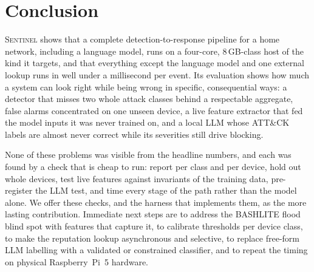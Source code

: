 \section{Conclusion}
\label{sec:conclusion}

\textsc{Sentinel} shows that a complete detection-to-response pipeline for a
home network, including a language model, runs on a four-core, 8\,GB-class host of the kind it targets,
and that everything except the language model and one external lookup runs in
well under a millisecond per event. Its evaluation shows how much a system can
look right while being wrong in specific, consequential ways: a detector that
misses two whole attack classes behind a respectable aggregate, false alarms
concentrated on one unseen device, a live feature extractor that fed the model
inputs it was never trained on, and a local LLM whose ATT\&CK labels are almost
never correct while its severities still drive blocking.

None of these problems was visible from the headline numbers, and each was
found by a check that is cheap to run: report per class and per device, hold
out whole devices, test live features against invariants of the training data,
pre-register the LLM test, and time every stage of the path rather than the
model alone. We offer these checks, and the harness that implements them, as
the more lasting contribution. Immediate next steps are to address the
BASHLITE flood blind spot with features that capture it, to calibrate
thresholds per device class, to make the reputation lookup asynchronous and
selective, to replace free-form LLM labelling with a validated or constrained
classifier, and to repeat the timing on physical Raspberry~Pi~5 hardware.
